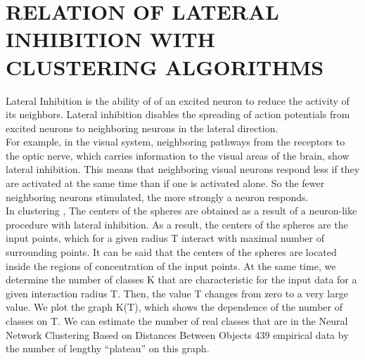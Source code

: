 \documentclass[letterpaper, 10 pt, conference]{ieeeconf}  %
\begin{document}
\section{RELATION OF LATERAL INHIBITION WITH CLUSTERING ALGORITHMS}
Lateral Inhibition is the ability of of an excited neuron to reduce the activity of its neighbors. Lateral inhibition disables the spreading of action potentials from excited neurons to neighboring neurons in the lateral direction.\\
For example, in the visual system, neighboring pathways from the receptors to the optic nerve, which carries information to the visual areas of the brain, show lateral inhibition. This means that neighboring visual neurons respond less  if they are activated at the same time than if one is activated alone. So the fewer neighboring neurons stimulated, the more strongly a neuron responds.\\
In clustering , The centers of the spheres are obtained as a result of a neuron-like procedure with lateral inhibition. As a result, the centers of the spheres are the input points, which for a given radius T interact with maximal number of surrounding points. It can be said that the centers of the spheres are located inside the regions of concentration of the input points. At the same time, we determine the number of classes K that are characteristic for the input data for a given interaction radius T. Then, the value T changes from zero to a very large value. We plot the graph K(T), which shows the dependence of the number of classes on T. We can estimate the number of real classes that are in the Neural Network Clustering Based on Distances Between Objects 439 empirical data by the number of lengthy “plateau” on this graph. 
\end{document}
